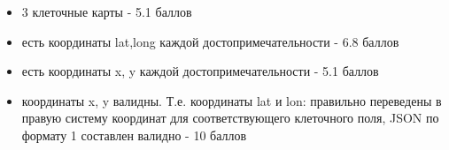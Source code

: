 \markSection

\begin{itemize}
    \item 3 клеточные карты - 5.1 баллов
    \item есть координаты lat,long каждой достопримечательности - 6.8 баллов
    \item есть координаты x, y каждой достопримечательности - 5.1 баллов
    \item координаты x, y валидны. Т.е. координаты lat и lon: правильно переведены в правую систему координат для соответствующего клеточного поля, JSON по формату 1 составлен валидно - 10 баллов
\end{itemize}
